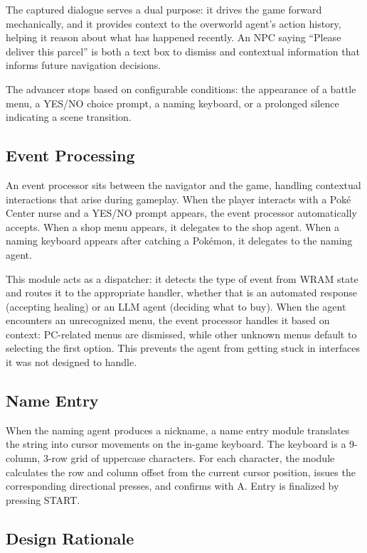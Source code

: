 \documentclass{article}
\begin{document}
The captured dialogue serves a dual purpose: it drives the game forward mechanically, and it provides context to the overworld agent's action history, helping it reason about what has happened recently. An NPC saying ``Please deliver this parcel'' is both a text box to dismiss and contextual information that informs future navigation decisions.

The advancer stops based on configurable conditions: the appearance of a battle menu, a YES/NO choice prompt, a naming keyboard, or a prolonged silence indicating a scene transition.

\subsection{Event Processing}

An event processor sits between the navigator and the game, handling contextual interactions that arise during gameplay. When the player interacts with a Pok\'{e} Center nurse and a YES/NO prompt appears, the event processor automatically accepts. When a shop menu appears, it delegates to the shop agent. When a naming keyboard appears after catching a Pok\'{e}mon, it delegates to the naming agent.

This module acts as a dispatcher: it detects the type of event from WRAM state and routes it to the appropriate handler, whether that is an automated response (accepting healing) or an LLM agent (deciding what to buy). When the agent encounters an unrecognized menu, the event processor handles it based on context: PC-related menus are dismissed, while other unknown menus default to selecting the first option. This prevents the agent from getting stuck in interfaces it was not designed to handle.

\subsection{Name Entry}

When the naming agent produces a nickname, a name entry module translates the string into cursor movements on the in-game keyboard. The keyboard is a 9-column, 3-row grid of uppercase characters. For each character, the module calculates the row and column offset from the current cursor position, issues the corresponding directional presses, and confirms with A. Entry is finalized by pressing START.

\subsection{Design Rationale}
\end{document}
